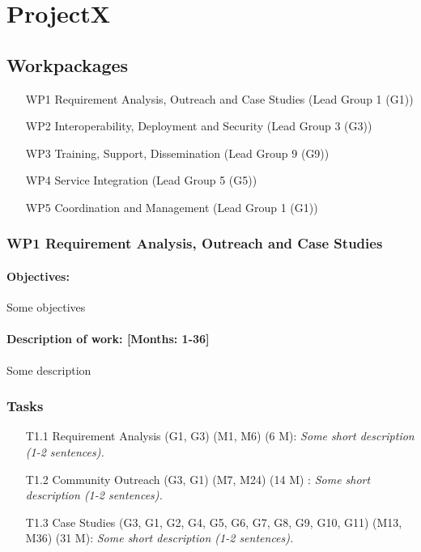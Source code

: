 \documentclass{report}
\begin{document}
\chapter{ProjectX}


\section*{Workpackages}

\begin{enumerate}
\item [WP1] Requirement Analysis, Outreach and Case Studies (Lead Group 1 (G1))
\item [WP2] Interoperability, Deployment and Security (Lead Group 3 (G3))
\item [WP3] Training, Support, Dissemination (Lead Group 9 (G9))
\item [WP4] Service Integration (Lead Group 5 (G5))
\item [WP5] Coordination and Management (Lead Group 1 (G1))
\end{enumerate}


\subsection*{WP1 Requirement Analysis, Outreach and Case Studies}

\subsubsection{Objectives:} Some objectives
\subsubsection{Description of work: [Months: 1-36]} Some description

\subsection*{Tasks}

\begin{enumerate}
\item [T1.1] Requirement Analysis (G1, G3) (M1, M6) (6 M): \emph{ Some short description (1-2 sentences).}
\item [T1.2] Community Outreach (G3, G1) (M7, M24) (14 M) : \emph{ Some short description (1-2 sentences).}
\item [T1.3] Case Studies (G3, G1, G2, G4, G5, G6, G7, G8, G9, G10, G11) (M13, M36) (31 M): \emph{ Some short description (1-2 sentences).}
\end{enumerate}
\end{document}
